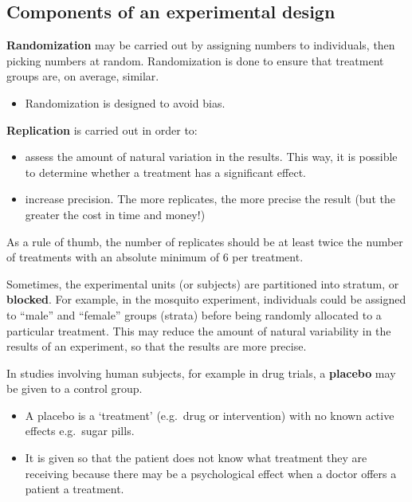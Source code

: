 \documentclass[
  oneside]{krantz}
\providecommand{\tightlist}{%
  \setlength{\itemsep}{0pt}\setlength{\parskip}{0pt}}
\begin{document}
\hypertarget{components-of-an-experimental-design}{%
\subsection{Components of an experimental design}\label{components-of-an-experimental-design}}

\textbf{Randomization} may be carried out by assigning numbers to individuals, then picking numbers at random. Randomization is done to ensure that treatment groups are, on average, similar.

\begin{itemize}
\tightlist
\item
  Randomization is designed to avoid bias.
\end{itemize}

\textbf{Replication} is carried out in order to:

\begin{itemize}
\item
  assess the amount of natural variation in the results. This way, it is possible to determine whether a treatment has a significant effect.
\item
  increase precision. The more replicates, the more precise the result (but the greater the cost in time and money!)
\end{itemize}

As a rule of thumb, the number of replicates should be at least twice the number of treatments with an absolute minimum of 6 per treatment.

Sometimes, the experimental units (or subjects) are partitioned into stratum, or \textbf{blocked}. For example,
in the mosquito experiment, individuals could be assigned to ``male'' and ``female'' groups (strata) before being randomly allocated to a particular treatment. This may reduce the amount of natural variability in the results of an experiment, so that the results are more precise.

In studies involving human subjects, for example in drug trials, a \textbf{placebo} may be given to a control group.

\begin{itemize}
\item
  A placebo is a `treatment' (e.g.~drug or intervention) with no known active effects e.g.~sugar pills.
\item
  It is given so that the patient does not know what treatment they are receiving because there may be a psychological effect when a doctor offers a patient a treatment.
\end{itemize}
\end{document}
